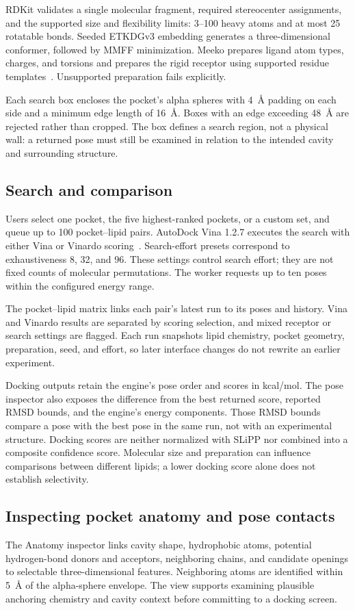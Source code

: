 \documentclass[10pt,a4paper]{article}
\begin{document}
RDKit validates a single molecular fragment, required stereocenter assignments, and the supported size and flexibility limits: 3--100 heavy atoms and at most 25 rotatable bonds. Seeded ETKDGv3 embedding generates a three-dimensional conformer, followed by MMFF minimization. Meeko prepares ligand atom types, charges, and torsions and prepares the rigid receptor using supported residue templates~\cite{rdkit,meeko}. Unsupported preparation fails explicitly.

Each search box encloses the pocket's alpha spheres with 4~\AA{} padding on each side and a minimum edge length of 16~\AA. Boxes with an edge exceeding 48~\AA{} are rejected rather than cropped. The box defines a search region, not a physical wall: a returned pose must still be examined in relation to the intended cavity and surrounding structure.

\subsection{Search and comparison}
Users select one pocket, the five highest-ranked pockets, or a custom set, and queue up to 100 pocket--lipid pairs. AutoDock Vina 1.2.7 executes the search with either Vina or Vinardo scoring~\cite{vina12,vinardo}. Search-effort presets correspond to exhaustiveness 8, 32, and 96. These settings control search effort; they are not fixed counts of molecular permutations. The worker requests up to ten poses within the configured energy range.

The pocket--lipid matrix links each pair's latest run to its poses and history. Vina and Vinardo results are separated by scoring selection, and mixed receptor or search settings are flagged. Each run snapshots lipid chemistry, pocket geometry, preparation, seed, and effort, so later interface changes do not rewrite an earlier experiment.

Docking outputs retain the engine's pose order and scores in kcal/mol. The pose inspector also exposes the difference from the best returned score, reported RMSD bounds, and the engine's energy components. Those RMSD bounds compare a pose with the best pose in the same run, not with an experimental structure. Docking scores are neither normalized with SLiPP nor combined into a composite confidence score. Molecular size and preparation can influence comparisons between different lipids; a lower docking score alone does not establish selectivity.

\subsection{Inspecting pocket anatomy and pose contacts}
The Anatomy inspector links cavity shape, hydrophobic atoms, potential hydrogen-bond donors and acceptors, neighboring chains, and candidate openings to selectable three-dimensional features. Neighboring atoms are identified within 5~\AA{} of the alpha-sphere envelope. The view supports examining plausible anchoring chemistry and cavity context before committing to a docking screen.
\end{document}

